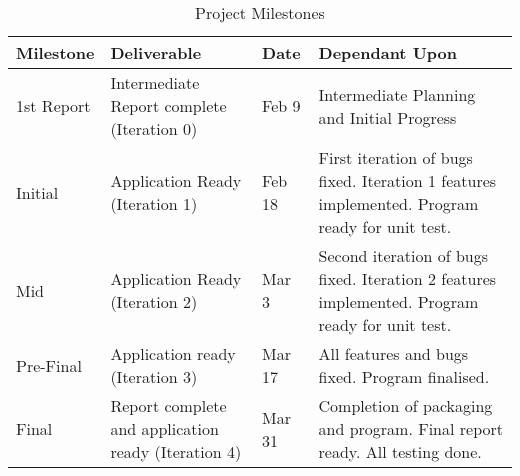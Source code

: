 \documentclass[11pt]{article}
\begin{document}
 	\begin{table}[H]
		\caption{Project Milestones} %
		\centering %
		\begin{tabular}{p{2cm}|p{4cm}|p{2cm}|p{4cm}} %
		\hline\hline %
		Milestone & Deliverable & Date & Dependant Upon \\ [0.5ex] %
		\hline
		
		1st Report & Intermediate Report complete (Iteration 0) & Feb 9 & Intermediate Planning and Initial Progress\\[1ex]
		
		Initial & Application Ready (Iteration 1) & Feb 18 & First iteration of bugs fixed. Iteration 1 features implemented. Program ready for unit test.  \\ [1ex]
		
		Mid & Application Ready (Iteration 2) & Mar 3 &  Second iteration of bugs fixed. Iteration 2 features implemented. Program ready for unit test.\\ [1ex]
		
		Pre-Final & Application ready (Iteration 3) & Mar 17 & All features and bugs fixed. Program finalised. \\[1ex]
		
		Final & Report complete and application ready (Iteration 4)  & Mar 31 & Completion of packaging and program. Final report ready. All testing done. \\[1ex] %
		\hline
		\end{tabular}
		\label{table:milestones} %
	\end{table}
\end{document}
